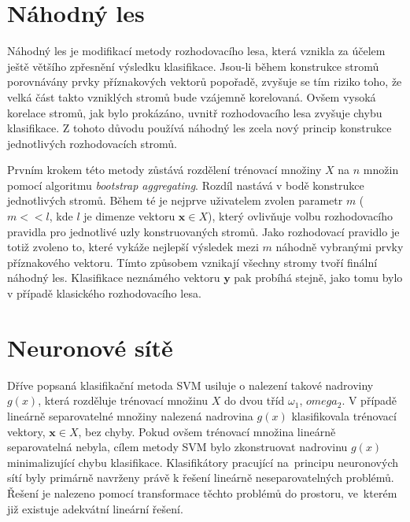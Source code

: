 {%
\section{Náhodný les}
\label{sec:RandomWald}
\par{Náhodný les je modifikací metody rozhodovacího lesa, která vznikla
za účelem ještě většího zpřesnění výsledku klasifikace. Jsou-li během konstrukce stromů porovnávány prvky příznakových vektorů popořadě, zvyšuje se tím riziko toho, že velká část takto vzniklých stromů bude vzájemně korelovaná. Ovšem vysoká korelace stromů, jak bylo prokázáno, uvnitř rozhodovacího lesa zvyšuje chybu klasifikace. Z tohoto důvodu používá náhodný les zcela nový princip konstrukce jednotlivých rozhodovacích stromů.}
\par{Prvním krokem této metody zůstává rozdělení trénovací množiny $X$ na $n$ množin pomocí algoritmu \textit{bootstrap aggregating}. Rozdíl nastává v bodě konstrukce jednotlivých stromů. Během té je nejprve uživatelem zvolen parametr $m$ ($m<<l$, kde $l$ je dimenze vektoru $\bm{x}\in X$),
který ovlivňuje volbu rozhodovacího pravidla pro jednotlivé uzly konstruovaných stromů. Jako rozhodovací pravidlo je totiž zvoleno to, které vykáže nejlepší výsledek mezi $m$ náhodně vybranými prvky příznakového vektoru. Tímto způsobem vznikají všechny stromy tvoří finální náhodný les. Klasifikace neznámého vektoru $\bm{y}$ pak probíhá stejně, jako tomu bylo v případě klasického rozhodovacího lesa.
}









\newpage





\section{Neuronové sítě}
\par{Dříve popsaná klasifikační metoda SVM usiluje o nalezení takové nadroviny $g\left(x\right)$, která rozděluje trénovací množinu $X$ do dvou tříd $\omega_1$, $omega_2$. V případě lineárně separovatelné množiny nalezená nadrovina $g\left(x\right)$ klasifikovala trénovací vektory, $\bm{x}\in X$, bez chyby. Pokud ovšem trénovací množina lineárně separovatelná nebyla, cílem metody SVM bylo zkonstruovat nadrovinu $g\left(x\right)$ minimalizující chybu klasifikace. Klasifikátory pracující na~principu neuronových sítí byly primárně navrženy právě k řešení lineárně neseparovatelných problémů. Řešení je nalezeno pomocí transformace těchto problémů
do prostoru, ve~kterém již existuje adekvátní lineární řešení.}

}
